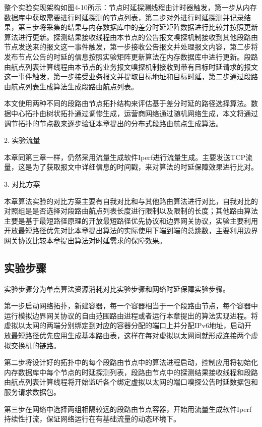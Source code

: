 整个实验实现架构如图4-10所示：节点时延探测线程由计时器触发，第一步从内存数据库中获取需要进行时延探测的节点列表，第二步对外进行时延探测并记录结果，第三步将采集的结果与内存数据库中的差分时延矩阵数据进行比较并按照更新算法进行更新。探测结果接收线程由本节点的公告报文嗅探机制接收到其他段路由节点发送来的报文这一事件触发，第一步接收公告报文并处理报文内容，第二步将发布节点公告的时延的信息按照实验矩阵更新算法在内存数据库中进行更新。段路由航点列表计算线程由本节点的业务报文嗅探机制接收到带有目标时延请求的报文这一事件触发，第一步接受业务报文并提取目标地址和目标时延，第二步通过段路由航点列表生成算法生成段路由航点列表。

本文使用两种不同的段路由节点拓扑结构来评估基于差分时延的路径选择算法。数据中心拓扑由树状拓扑通过调惨生成，运营商网络通过随机网络生成，本文将通过调节拓扑的节点数来逐步验证本章提出的分布式段路由航点生成算法。

2. 实验流量

本章同第三章一样，仍然采用流量生成软件Iperf进行流量生成。主要发送TCP流量，这是为了获取报文中详细信息的时间戳，来对算法的时延保障效果进行比对。

3. 对比方案

本章算法实验的对比方案主要有自我对比和与其他路由算法进行对比，自我对比的对照组是是否选择对段路由航点列表长度进行限制以及限制的长度；其他路由算法主要是基于最短路径原理的开放最短路径优先协议和边界网关协议，实验主要利用开放最短路径优先对比本章提出算法的实际使用下端到端的总跳数，主要利用边界网关协议比较本章提出算法对时延需求的保障效果。

\subsection{实验步骤}

实验步骤分为单点算法资源消耗对比实验步骤和网络时延保障实验步骤。

第一步启动网络拓扑，新建容器，每一个容器相当于一个段路由节点，每个容器中运行模拟边界网关协议的自由范围路由进程或者运行本章提出的算法实现进程。将虚拟以太网的两端分别绑定到对应的容器分配的端口上并分配IPv6地址，启动开放最短路径优先应用生成基本路由表，这样在每对虚拟以太网间就形成连接两个虚拟交换机的链路。

第二步将设计好的拓扑中的每个段路由节点中的算法进程启动，控制应用将初始化内存数据库中每个节点的时延探测列表，段路由节点中的探测结果接收线程和段路由航点列表计算线程将开始监听各个绑定虚拟以太网的端口嗅探公告时延数据包和服务请求数据包。

第三步在网络中选择两组相隔较远的段路由节点容器，开始用流量生成软件Iperf持续性打流，保证网络运行在有基础流量的动态环境下。


